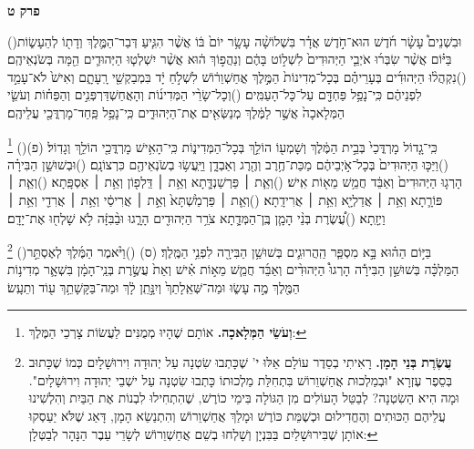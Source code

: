 \documentclass[12pt, openany]{book}
\newcommand{\chapname}{}
\newcommand{\newchap}[1]{
	\addcontentsline{toc}{chapter}{#1}
	\renewcommand{\chapname}{#1}
		\begin{center}
			\textbf{%
\fontsize{16pt}{16pt}\selectfont
				#1}
		\end{center}
}
\newcommand{\footnotecomment}[1]{
	\renewcommand\thefootnote{}
	\footnote{\textsf{#1}}}
\newcommand{\commenta}[1]{\footnotecomment{#1}\hspace{0em}}
\newcommand{\vsnum}[1]{(\hebrewnumeral{#1})\space}
\begin{document}
\newchap{פרק ט}
\begin{multicols}{2}
\vsnum{1}וּבִשְׁנֵים֩ עָשָׂ֨ר חֹ֜דֶשׁ הוּא־חֹ֣דֶשׁ אֲדָ֗ר בִּשְׁלוֹשָׁ֨ה עָשָׂ֥ר יוֹם֙ בּ֔וֹ אֲשֶׁ֨ר הִגִּ֧יעַ דְּבַר־הַמֶּ֛לֶךְ וְדָת֖וֹ לְהֵעָשׂ֑וֹת בַּיּ֗וֹם אֲשֶׁ֨ר שִׂבְּר֜וּ אֹיְבֵ֤י הַיְּהוּדִים֙ לִשְׁל֣וֹט בָּהֶ֔ם וְנַהֲפ֣וֹךְ ה֔וּא אֲשֶׁ֨ר יִשְׁלְט֧וּ הַיְּהוּדִ֛ים הֵ֖מָּה בְּשֹׂנְאֵיהֶֽם׃
\vsnum{2}נִקְהֲל֨וּ הַיְּהוּדִ֜ים בְּעָרֵיהֶ֗ם בְּכָל־מְדִינוֹת֙ הַמֶּ֣לֶךְ אֳחַשְׁוֵר֔וֹשׁ לִשְׁלֹ֣חַ יָ֔ד בִּמְבַקְשֵׁ֖י רָֽעָתָ֑ם וְאִישׁ֙ לֹא־עָמַ֣ד לִפְנֵיהֶ֔ם כִּֽי־נָפַ֥ל פַּחְדָּ֖ם עַל־כָּל־הָעַמִּֽים׃
\vsnum{3}וְכָל־שָׂרֵ֨י הַמְּדִינ֜וֹת וְהָאֲחַשְׁדַּרְפְּנִ֣ים וְהַפַּח֗וֹת וְעֹשֵׂ֤י הַמְּלָאכָה֙ אֲשֶׁ֣ר לַמֶּ֔לֶךְ מְנַשְּׂאִ֖ים אֶת־הַיְּהוּדִ֑ים כִּֽי־נָפַ֥ל פַּֽחַד־מָרְדֳּכַ֖י עֲלֵיהֶֽם׃%
\commenta{\textrm{\textbf{וְעֹשֵׂי הַמְּלָאכָה.}} אוֹתָם שֶׁהָיוּ מְמֻנִּים לַעֲשׂוֹת צָרְכֵי הַמֶּלֶךְ:}%
\vsnum{4}כִּֽי־גָ֤דוֹל מָרְדֳּכַי֙ בְּבֵ֣ית הַמֶּ֔לֶךְ וְשָׁמְע֖וֹ הוֹלֵ֣ךְ בְּכָל־הַמְּדִינ֑וֹת כִּֽי־הָאִ֥ישׁ מָרְדֳּכַ֖י הוֹלֵ֥ךְ וְגָדֽוֹל׃ (פ)
\vsnum{5}וַיַּכּ֤וּ הַיְּהוּדִים֙ בְּכָל־אֹ֣יְבֵיהֶ֔ם מַכַּת־חֶ֥רֶב וְהֶ֖רֶג וְאַבְדָ֑ן וַיַּֽעֲשׂ֥וּ בְשֹׂנְאֵיהֶ֖ם כִּרְצוֹנָֽם׃
\vsnum{6}וּבְשׁוּשַׁ֣ן הַבִּירָ֗ה הָרְג֤וּ הַיְּהוּדִים֙ וְאַבֵּ֔ד חֲמֵ֥שׁ מֵא֖וֹת אִֽישׁ׃
\vsnum{7}וְאֵ֧ת ׀ פַּרְשַׁנְדָּ֛תָא וְאֵ֥ת ׀ דַּֽלְפ֖וֹן וְאֵ֥ת ׀ אַסְפָּֽתָא׃
\vsnum{8}וְאֵ֧ת ׀ פּוֹרָ֛תָא וְאֵ֥ת ׀ אֲדַלְיָ֖א וְאֵ֥ת ׀ אֲרִידָֽתָא׃
\vsnum{9}וְאֵ֤ת ׀ פַּרְמַ֙שְׁתָּא֙ וְאֵ֣ת ׀ אֲרִיסַ֔י וְאֵ֥ת ׀ אֲרִדַ֖י וְאֵ֥ת ׀ וַיְזָֽתָא׃
\vsnum{10}עֲ֠שֶׂרֶת בְּנֵ֨י הָמָ֧ן בֶּֽן־הַמְּדָ֛תָא צֹרֵ֥ר הַיְּהוּדִ֖ים הָרָ֑גוּ וּבַ֨בִּזָּ֔ה לֹ֥א שָׁלְח֖וּ אֶת־יָדָֽם׃%
\commenta{\textrm{\textbf{עֲשֶׂרֶת בְּנֵי הָמָן.}} רָאִיתִי בְסֵדֶר עוֹלָם אֵלּוּ י' שֶׁכָּתְבוּ שִׂטְנָה עַל יְהוּדָה וִירוּשָׁלָיִם כְּמוֹ שֶׁכָּתוּב בְּסֵפֶר עֶזְרָא "וּבְמַלְכוּת אֲחַשְׁוֵרוֹשׁ בִּתְחִלַּת מַלְכוּתוֹ כָּתְבוּ שִׂטְנָה עַל ישְׁבֵי יְהוּדָה וִירוּשָׁלָיִם". וּמָה הִיא הַשִׂטְנָה? לְבַטֵּל הָעוֹלִים מִן הַגּוֹלָה בִּימֵי כוֹרֶשׁ, שֶׁהִתְחִילוּ לִבְנוֹת אֶת הַבַּיִת וְהִלְשִׁינוּ עֲלֵיהֶם הַכּוּתִים וְהֶחֱדִילוּם וּכְשֶׁמֵּת כּוֹרֶשׁ וּמָלַךְ אֲחַשְׁוֵרוֹשׁ וְהִתְנַשֵׂא הָמָן, דָּאַג שֶׁלֹּא יַעַסְקוּ אוֹתָן שֶׁבִּירוּשָׁלַיִם בַּבִּנְיָן וְשָׁלְחוּ בְשֵׁם אֲחַשְׁוֵרוֹשׁ לְשָׂרֵי עֵבֶר הַנָּהָר לְבַטְּלָן: }%
\vsnum{11}בַּיּ֣וֹם הַה֗וּא בָּ֣א מִסְפַּ֧ר הַֽהֲרוּגִ֛ים בְּשׁוּשַׁ֥ן הַבִּירָ֖ה לִפְנֵ֥י הַמֶּֽלֶךְ׃ (ס)
\vsnum{12}וַיֹּ֨אמֶר הַמֶּ֜לֶךְ לְאֶסְתֵּ֣ר הַמַּלְכָּ֗ה בְּשׁוּשַׁ֣ן הַבִּירָ֡ה הָרְגוּ֩ הַיְּהוּדִ֨ים וְאַבֵּ֜ד חֲמֵ֧שׁ מֵא֣וֹת אִ֗ישׁ וְאֵת֙ עֲשֶׂ֣רֶת בְּנֵֽי־הָמָ֔ן בִּשְׁאָ֛ר מְדִינ֥וֹת הַמֶּ֖לֶךְ מֶ֣ה עָשׂ֑וּ וּמַה־שְּׁאֵֽלָתֵךְ֙ וְיִנָּ֣תֵֽן לָ֔ךְ וּמַה־בַּקָּשָׁתֵ֥ךְ ע֖וֹד וְתֵעָֽשׂ׃

\end{multicols}
\end{document}
